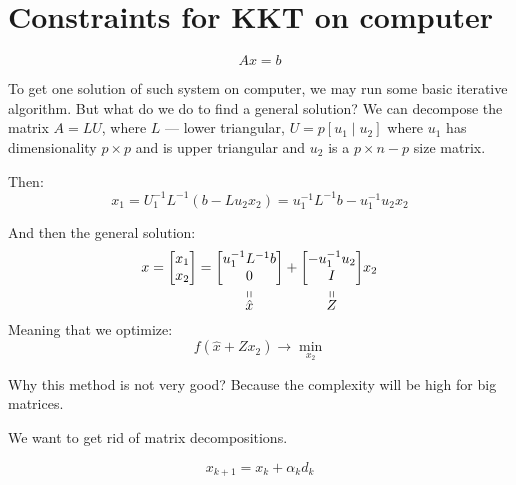 \section{Constraints for KKT on computer}

\[ 
    A x = b 
\] 

To get one solution of such system on computer, we may run some basic iterative algorithm. But what do we do to find a general solution? We can decompose the matrix $A = L U$, where $L$ --- lower triangular, $U = p[u_1 \mid u_2]$ where $u_1$ has dimensionality $p \times p$ and is upper triangular and $u_2$ is a $p \times n - p$ size matrix. 

Then: 
\[ 
    x_1 = U_1^{-1} L^{-1} (b - L u_2 x_2) = u_1^{-1} L^{-1} b - u_1^{-1} u_2 x_2 
\] 

And then the general solution: 
\[ 
    x = \begin{bmatrix}
        x_1 \\ 
        x_2
    \end{bmatrix} = \stackbelow{\begin{bmatrix}
        u_1^{-1} L^{-1} b \\ 
        0 
    \end{bmatrix}}{\hat{x}} + \stackbelow{\begin{bmatrix}
        -u_1^{-1} u_2 \\ 
        I
    \end{bmatrix}}{Z} x_2
\] 
Meaning that we optimize: 
\[ 
    f(\hat{x} + Z x_2) \to \min_{x_2}
\] 

Why this method is not very good? Because the complexity will be high for big matrices. 

We want to get rid of matrix decompositions. 

\[ 
    x_{k+1} = x_k + \alpha_k d_k
\] 

